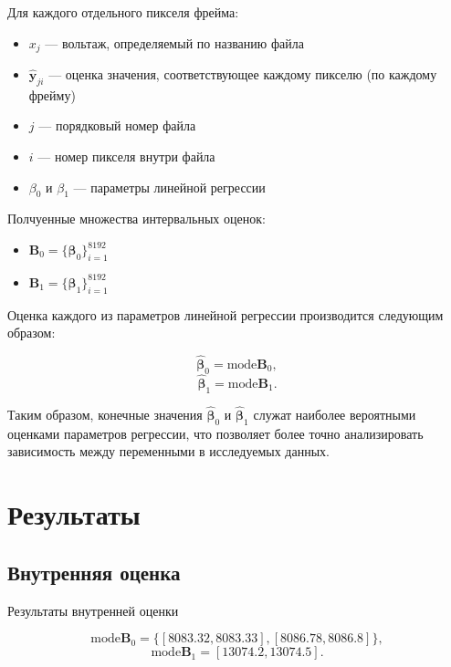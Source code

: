 \documentclass{article}
\begin{document}
  Для каждого отдельного пикселя фрейма:
  \begin{itemize}
    \item \( x_j \) --- вольтаж, определяемый по названию файла
    \item \( \hat{\mathbf{y}}_{ji} \) --- оценка значения, соответствующее каждому пикселю (по каждому фрейму)
    \item \( j \) --- порядковый номер файла
    \item  \( i \) --- номер пикселя внутри файла
    \item \( \beta_0 \) и \( \beta_1 \) --- параметры линейной регрессии
  \end{itemize}

  Полчуенные множества интервальных оценок:
  \begin{itemize}
    \item \( \mathbf{B}_0 = \{ \mathbf{\beta}_0 \}_{i=1}^{8192} \)
    \item \( \mathbf{B}_1 = \{ \mathbf{\beta}_1 \}_{i=1}^{8192} \)
  \end{itemize}

  Оценка каждого
  из параметров линейной регрессии производится следующим образом:

  \[ \hat{\mathbf{\beta}}_0 = \text{mode} \mathbf{B}_0, \]
  \[ \hat{\mathbf{\beta}}_1 = \text{mode} \mathbf{B}_1. \]

  Таким образом, конечные значения \( \hat{\mathbf{\beta}}_0 \) и
  \( \hat{\mathbf{\beta}}_1 \) служат наиболее вероятными оценками
  параметров регрессии, что позволяет более точно анализировать
  зависимость между переменными в исследуемых данных.

  \section{Результаты}

  \subsection{Внутренняя оценка}

  Результаты внутренней оценки

  \[
    \text{mode} \mathbf{B}_0
      = \{ [8083.32, 8083.33], [8086.78, 8086.8] \},
  \]
  \[
    \text{mode} \mathbf{B}_1 = [13074.2, 13074.5].
  \]
\end{document}
